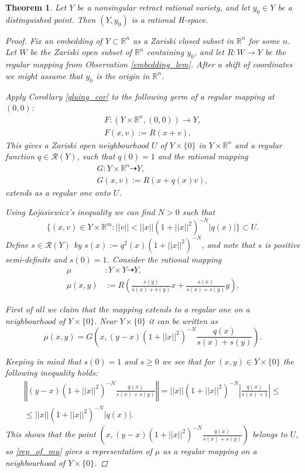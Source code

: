 \documentclass{article}
\theoremstyle{plain}
\newtheorem{thm}{Theorem}[section]
\theoremstyle{definition}
\theoremstyle{remark}
\newcommand{\R}{\mathbb{R}}
\newcommand{\RR}{\mathcal{R}}
\begin{document}
\begin{thm}
Let $Y$ be a nonsingular retract rational variety, and let $y_0\in Y$ be a distinguished point. Then $(Y,y_0)$ is a rational H-space.
\begin{proof}
Fix an embedding of $Y\subset \R^n$ as a Zariski closed subset in $\R^n$ for some $n$. Let $W$ be the Zariski open subset of $\R^n$ containing $y_0$, and let $R:W\rightarrow Y$ be the regular mapping from Observation \ref{embedding_lem}. After a shift of coordinates we might assume that $y_0$ is the origin in $\R^n$.


Apply Corollary \ref{gluing_cor} to the following germ of a regular mapping at $(0,0)$:
\begin{align*}
    F:(Y\times \R^n,(0,0))\rightarrow Y, \\
    F(x,v):=R(x+v).
\end{align*}
This gives a Zariski open neighbourhood $U$ of $Y\times\{0\}$ in $Y\times\R^n$ and a regular function $q\in\RR(Y)$, such that $q(0)=1$ and the rational mapping
\begin{gather*}
    G:Y\times \R^n\dashrightarrow Y,\\
    G(x,v):= R(x+q(x)v),
\end{gather*}
extends as a regular one onto $U$. 

Using Łojasiewicz's inequality \cite[Proposition 2.6.2]{bochnakRealAlgebraicGeometry1998} we can find $N>0$ such that
\begin{equation*}
    \{(x,v)\in Y\times \R^m:  ||v||<||x||(1+||x||^2)^{-N}|q(x)|\}\subset U.
\end{equation*}
Define $s\in\RR(Y)$ by $s(x):=q^2(x)(1+||x||^2)^{-N}$, and note that $s$ is positive semi-definite and $s(0)=1$. Consider the rational mapping 
\begin{align*}
    \mu&:Y\times Y\dashrightarrow Y, \\
    \mu(x,y)&:=R\left(\frac{s(y)}{s(x)+s(y)}x+\frac{s(x)}{s(x)+s(y)}y\right).
\end{align*}

First of all we claim that the mapping extends to a regular one on a neighbourhood of $Y\times\{0\}$. Near $Y\times\{0\}$ it can be written as
\begin{equation}\label{rep_of_mu}
    \mu(x,y)=G\left(x,(y-x)(1+||x||^2)^{-N}\frac{q(x)}{s(x)+s(y)}\right).
\end{equation}

Keeping in mind that $s(0)=1$ and $s\geq 0$ we see that for $(x,y)\in Y\times\{0\}$ the following inequality holds:
\begin{multline*}
\left\Vert(y-x)(1+||x||^2)^{-N}\frac{q(x)}{s(x)+s(y)}\right\Vert=||x||(1+||x||^2)^{-N}\left|\frac{q(x)}{s(x)+1}\right|\leq\\
\leq ||x||(1+||x||^2)^{-N}|q(x)|.
\end{multline*}
This shows that the point $\left(x,(y-x)(1+||x||^2)^{-N}\frac{q(x)}{s(x)+s(y)}\right)$ belongs to $U$, so \eqref{rep_of_mu} gives a representation of $\mu$ as a regular mapping on a neighbourhood of $Y\times \{0\}$. 


\end{proof}
\end{thm}
\end{document}
